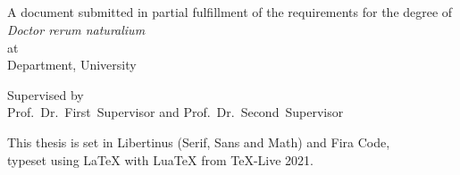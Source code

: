 

\makeatletter
\begin{titlepage}


  \vspace*{2cm}
  \begin{center}
    {\@title \\[0.5\baselineskip]}
    {\@subtitle\\[0.5\baselineskip]}
    {\@author\\[0.5\baselineskip]}
    {\@date}\\


    {\large%
      A document submitted in partial fulfillment of the requirements for the degree of \\
      \emph{Doctor rerum naturalium} \\
      at \\
      Department, University
    }

    \vfill
    {\large%
      Supervised by \\
      Prof.~Dr.~First~Supervisor and Prof.~Dr.~Second~Supervisor
    }%
  \end{center}
\end{titlepage}
\makeatother

\newpage
\thispagestyle{empty}
\vspace*{\fill}
\small\noindent%
This thesis is set in Libertinus (Serif, Sans and Math) and Fira Code,\\
typeset using \LaTeX{} with Lua\TeX{} from \TeX-Live 2021.\\
\newpage

